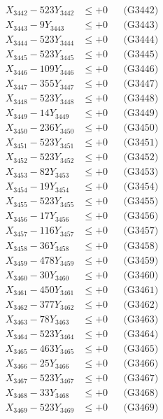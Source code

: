 \documentclass[a4paper,10pt]{article}
\begin{document}
{\begin{align}
X_{3442} - 523Y_{3442} &\leq +0 && \text{(G3442)} \\
X_{3443} - 9Y_{3443} &\leq +0 && \text{(G3443)} \\
X_{3444} - 523Y_{3444} &\leq +0 && \text{(G3444)} \\
X_{3445} - 523Y_{3445} &\leq +0 && \text{(G3445)} \\
X_{3446} - 109Y_{3446} &\leq +0 && \text{(G3446)} \\
X_{3447} - 355Y_{3447} &\leq +0 && \text{(G3447)} \\
X_{3448} - 523Y_{3448} &\leq +0 && \text{(G3448)} \\
X_{3449} - 14Y_{3449} &\leq +0 && \text{(G3449)} \\
X_{3450} - 236Y_{3450} &\leq +0 && \text{(G3450)} \\
\allowbreak
X_{3451} - 523Y_{3451} &\leq +0 && \text{(G3451)} \\
X_{3452} - 523Y_{3452} &\leq +0 && \text{(G3452)} \\
X_{3453} - 82Y_{3453} &\leq +0 && \text{(G3453)} \\
X_{3454} - 19Y_{3454} &\leq +0 && \text{(G3454)} \\
X_{3455} - 523Y_{3455} &\leq +0 && \text{(G3455)} \\
X_{3456} - 17Y_{3456} &\leq +0 && \text{(G3456)} \\
X_{3457} - 116Y_{3457} &\leq +0 && \text{(G3457)} \\
X_{3458} - 36Y_{3458} &\leq +0 && \text{(G3458)} \\
X_{3459} - 478Y_{3459} &\leq +0 && \text{(G3459)} \\
X_{3460} - 30Y_{3460} &\leq +0 && \text{(G3460)} \\
\allowbreak
X_{3461} - 450Y_{3461} &\leq +0 && \text{(G3461)} \\
X_{3462} - 377Y_{3462} &\leq +0 && \text{(G3462)} \\
X_{3463} - 78Y_{3463} &\leq +0 && \text{(G3463)} \\
X_{3464} - 523Y_{3464} &\leq +0 && \text{(G3464)} \\
X_{3465} - 463Y_{3465} &\leq +0 && \text{(G3465)} \\
X_{3466} - 25Y_{3466} &\leq +0 && \text{(G3466)} \\
X_{3467} - 523Y_{3467} &\leq +0 && \text{(G3467)} \\
X_{3468} - 33Y_{3468} &\leq +0 && \text{(G3468)} \\
X_{3469} - 523Y_{3469} &\leq +0 && \text{(G3469)} \\

\end{align}}
\end{document}
